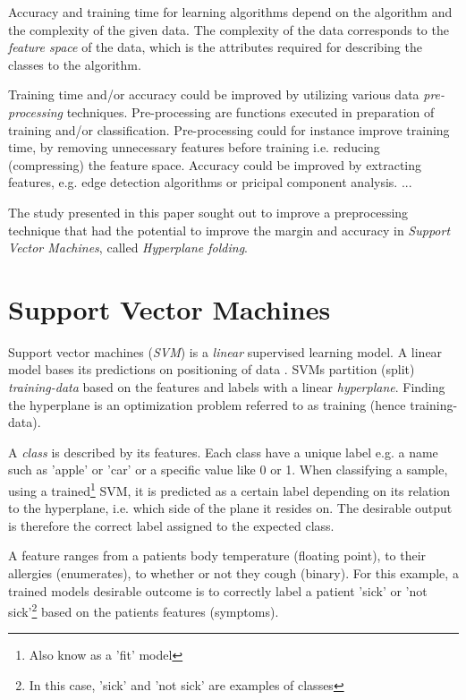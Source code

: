 \documentclass[a4paper,twoside]{bth}
\begin{document}
\par Accuracy and training time for learning algorithms depend on the algorithm and the complexity of the given data. The complexity of the data corresponds to the \textit{feature space} of the data, which is the attributes required for describing the classes to the algorithm\cite{Flach:2012:MLA:2490546}.

\par Training time and/or accuracy could be improved by utilizing various data \textit{pre-processing} techniques. Pre-processing are functions executed in preparation of training and/or classification. Pre-processing could for instance improve training time, by removing unnecessary features before training i.e. reducing (compressing) the feature space. Accuracy could be improved by extracting features, e.g. edge detection algorithms or pricipal component analysis. ...

\par The study presented in this paper sought out to improve a preprocessing technique that had the potential to improve the margin and accuracy in \textit{Support Vector Machines}, called \textit{Hyperplane folding}.

\section{Support Vector Machines}
Support vector machines (\textit{SVM}) is a \textit{linear} supervised learning model. A linear model bases its predictions on positioning of data \cite{Flach:2012:MLA:2490546, Cortes:1995:SN:218919.218929}. SVMs partition (split) \textit{training-data} based on the features and labels with a linear \textit{hyperplane}. Finding the hyperplane is an optimization problem referred to as training (hence training-data). 


\par A \textit{class} is described by its features. Each class have a unique label e.g. a name such as 'apple' or 'car' or a specific value like 0 or 1. When classifying a sample, using a trained\footnote{Also know as a 'fit' model} SVM, it is predicted as a certain label depending on its relation to the hyperplane, i.e. which side of the plane it resides on. The desirable output is therefore the correct label assigned to the expected class.

\par A feature ranges from a patients body temperature (floating point), to their allergies (enumerates), to whether or not they cough (binary). For this example, a trained models desirable outcome is to correctly label a patient 'sick' or 'not sick'\footnote{In this case, 'sick' and 'not sick' are examples of classes} based on the patients features (symptoms).
\end{document}
